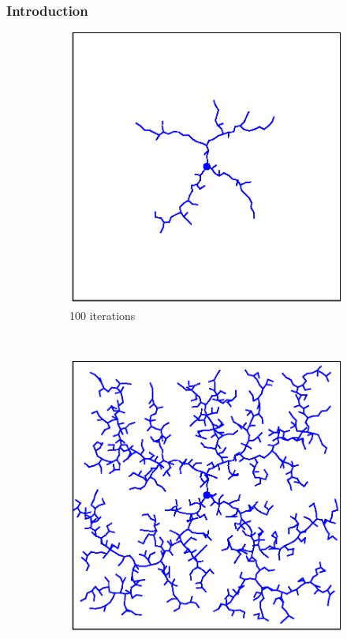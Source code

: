 \documentclass{beamer}
\begin{document}
\begin{frame}
	\frametitle{Introduction}	
	\begin{figure}[!ht]
		\centering
		\begin{subfigure}[b]{0.3\textwidth}
			\includegraphics[width=\textwidth]{figChap3/2RRTexpansion100.eps}
			\caption{100 iterations}
		\end{subfigure}
		~ %
		\begin{subfigure}[b]{0.3\textwidth}
			\includegraphics[width=\textwidth]{figChap3/2RRTexpansion1000.eps}

\end{subfigure}
\end{figure}
\end{frame}
\end{document}
